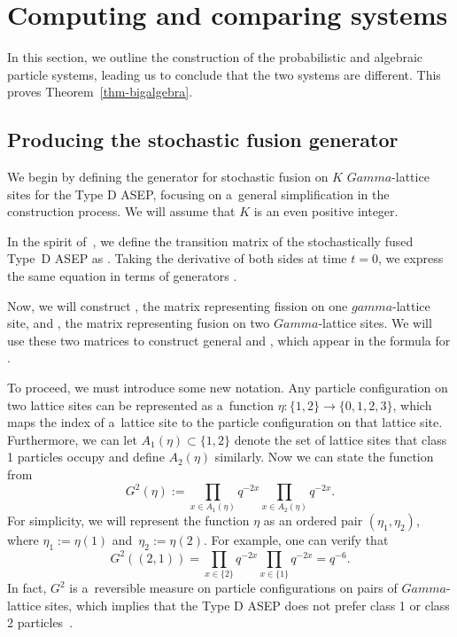 \documentclass[10pt,a4paper]{amsart}
\numberwithin{equation}{section}
\theoremstyle{definition}
\def\Gamma{Gamma}
\def\gamma{gamma}
\begin{document}
\section{Computing and comparing systems}
\label{section--ProbResults}

In this section, we outline the construction of the probabilistic and algebraic particle systems, leading us to conclude that the two systems are different. This proves Theorem~\ref{thm-bigalgebra}.

\subsection{Producing the stochastic fusion generator}\label{fusion-gen}

We begin by defining the generator for stochastic fusion on $K$ $\Gamma$-lattice sites for the Type D ASEP, focusing on a~general simplification in the construction process. We will assume that $K$ is an even positive integer.


In the spirit of~\cite[Section 3]{kuan2019stochastic}, we define the transition matrix of the stochastically fused Type~D ASEP as
.
Taking the derivative of both sides at time $t=0$, we express the same equation in terms of generators
.

Now, we will construct , the matrix representing fission on one $\gamma$-lattice site, and , the matrix representing fusion on two $\Gamma$-lattice sites. We will use these two matrices to construct general  and , which appear in the formula for .

To proceed, we must introduce some new notation. Any particle configuration on two lattice sites can be represented as a~function $\eta\colon\{1,2\} \rightarrow \{0,1,2,3\}$, which maps the index of a~lattice site to the particle configuration on that lattice site. Furthermore, we can let $A_1(\eta) \subset \{1,2\}$ denote the set of lattice sites that class 1 particles occupy and define $A_2(\eta)$ similarly. Now we can state the function from~\cite[Proposition 1.3]{kuan2020interactingparticlesystemstype}
\[G^2(\eta) := \prod_{x \in A_1(\eta)} q^{-2x}\prod_{x \in A_2(\eta)} q^{-2x}.\]
For simplicity, we will represent the function $\eta$ as an ordered pair $(\eta_1,\eta_2)$, where $\eta_1 := \eta(1)$ and~${\eta_2:= \eta(2)}$. For example, one can verify that
\[G^2((2,1)) = \prod_{x \in \{2\}}q^{-2x}\prod_{x \in \{1\}}q^{-2x} = q^{-6}.\]
In fact, $G^2$ is a~reversible measure on particle configurations on pairs of $\Gamma$-lattice sites, which implies that the Type D ASEP does not prefer class 1 or class 2 particles~\cite{kuan2020interactingparticlesystemstype}.
\end{document}

